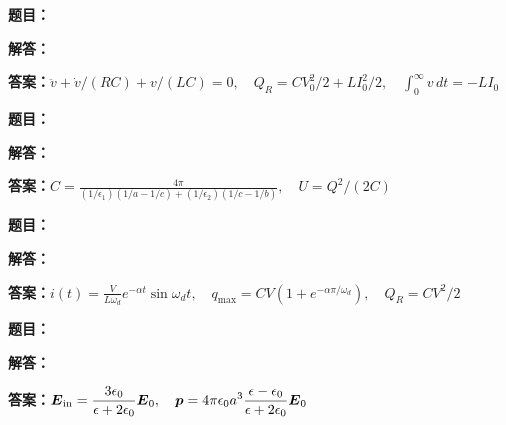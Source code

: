 \documentclass[lang=cn,color=blue,11pt]{elegantbook}
\begin{document}
\par
\noindent\textbf{题目：}
\par\noindent\textbf{解答：}
\par\noindent\textbf{答案：}\(\displaystyle \ddot v+\dot v/(RC)+v/(LC)=0,\quad Q_R=CV_0^2/2+LI_0^2/2,\quad \int_0^\infty v\,dt=-LI_0\)\par
\par\smallskip\noindent\hrulefill\par\medskip
{}\par
\noindent\textbf{题目：}
\par\noindent\textbf{解答：}
\par\noindent\textbf{答案：}\(\displaystyle C=\frac{4\pi}{(1/\epsilon_1)(1/a-1/c)+(1/\epsilon_2)(1/c-1/b)},\quad U=Q^2/(2C)\)\par
\par\smallskip\noindent\hrulefill\par\medskip
{}\par
\noindent\textbf{题目：}
\par\noindent\textbf{解答：}
\par\noindent\textbf{答案：}\(\displaystyle i(t)=\frac V{L\omega_d}e^{-\alpha t}\sin\omega_dt,\quad q_{\max}=CV(1+e^{-\alpha\pi/\omega_d}),\quad Q_R=CV^2/2\)\par
\par\smallskip\noindent\hrulefill\par\medskip
{}\par
\noindent\textbf{题目：}
\par\noindent\textbf{解答：}
\par\noindent\textbf{答案：}\(\displaystyle \boldsymbol E_{\rm in}=\frac{3\epsilon_0}{\epsilon+2\epsilon_0}\boldsymbol E_0,\quad \boldsymbol p=4\pi\epsilon_0a^3\frac{\epsilon-\epsilon_0}{\epsilon+2\epsilon_0}\boldsymbol E_0\)\par
\end{document}
